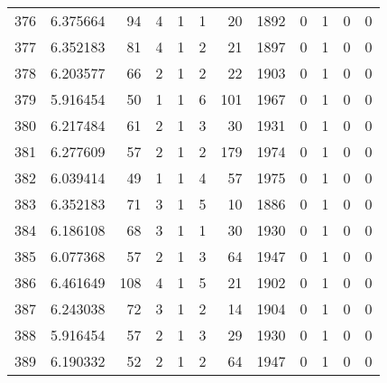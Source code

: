 \begin{tabular}{lrrrrrrrrrrr}
376 &  6.375664 &   94 &      4 &        1 &      1 &              20 &  1892 &               0 &               1 &               0 &               0 \\
377 &  6.352183 &   81 &      4 &        1 &      2 &              21 &  1897 &               0 &               1 &               0 &               0 \\
378 &  6.203577 &   66 &      2 &        1 &      2 &              22 &  1903 &               0 &               1 &               0 &               0 \\
379 &  5.916454 &   50 &      1 &        1 &      6 &             101 &  1967 &               0 &               1 &               0 &               0 \\
380 &  6.217484 &   61 &      2 &        1 &      3 &              30 &  1931 &               0 &               1 &               0 &               0 \\
381 &  6.277609 &   57 &      2 &        1 &      2 &             179 &  1974 &               0 &               1 &               0 &               0 \\
382 &  6.039414 &   49 &      1 &        1 &      4 &              57 &  1975 &               0 &               1 &               0 &               0 \\
383 &  6.352183 &   71 &      3 &        1 &      5 &              10 &  1886 &               0 &               1 &               0 &               0 \\
384 &  6.186108 &   68 &      3 &        1 &      1 &              30 &  1930 &               0 &               1 &               0 &               0 \\
385 &  6.077368 &   57 &      2 &        1 &      3 &              64 &  1947 &               0 &               1 &               0 &               0 \\
386 &  6.461649 &  108 &      4 &        1 &      5 &              21 &  1902 &               0 &               1 &               0 &               0 \\
387 &  6.243038 &   72 &      3 &        1 &      2 &              14 &  1904 &               0 &               1 &               0 &               0 \\
388 &  5.916454 &   57 &      2 &        1 &      3 &              29 &  1930 &               0 &               1 &               0 &               0 \\
389 &  6.190332 &   52 &      2 &        1 &      2 &              64 &  1947 &               0 &               1 &               0 &               0 \\

\end{tabular}
